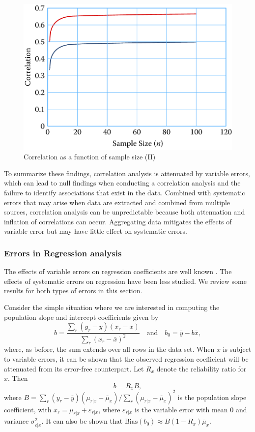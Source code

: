 \documentclass[]{krantz}
\begin{document}
\begin{figure}

{\centering \includegraphics[width=0.7\linewidth]{ChapterError/figures/fig10-5} 

}

\caption{Correlation as a function of sample size (II)}\label{fig:fig10-5}
\end{figure}

To summarize these findings, correlation analysis is attenuated by
variable errors, which can lead to null findings when conducting a
correlation analysis and the failure to identify associations that exist
in the data. Combined with systematic errors that may arise when data
are extracted and combined from multiple sources, correlation analysis
can be unpredictable because both attenuation and inflation of
correlations can occur. Aggregating data mitigates the effects of
variable error but may have little effect on systematic errors.

\subsubsection{Errors in Regression analysis}\label{sec:10-4.2.5}

The effects of variable errors on regression coefficients are well known
\citep{cochran1968errors, fuller1991regression, biemer1997review}. The
effects of systematic errors on regression have been less studied. We
review some results for both types of errors in this section.

Consider the simple situation where we are interested in computing the
population slope and intercept coefficients given by
\[\label{eq:10-1.10}
b = \frac{\sum_r {(y_r - \bar{y})(x_r - \bar{x})} }{\sum_r {(x_r
- \bar{x})^2} }\quad\mbox{and}\quad b_0 = \bar{y} - b\bar{x},\] where,
as before, the sum extends over all rows in the data set. When \(x\) is
subject to variable errors, it can be shown that the observed regression
coefficient will be attenuated from its error-free counterpart. Let
\(R_x\) denote the reliability ratio for \(x\). Then
\[\label{eq:10-1.11}
b = R_x B,\] where
\(B = \sum_r {(y_r - \bar{y})(\mu_{r\vert x} - \bar{\mu }_x )} / \sum_r {(\mu_{r\vert x} - \bar{\mu }_x )^2}\)
is the population slope coefficient, with
\(x_r = \mu_{r\vert x} + \varepsilon_{r\vert x}\), where
\(\varepsilon_{r\vert x}\) is the variable error with mean 0 and
variance \(\sigma_{\varepsilon\vert x}^2\). It can also be shown that
\(\mbox{Bias}(b_0 ) \approx B(1 - R_x )\bar{\mu }_x\).
\end{document}
